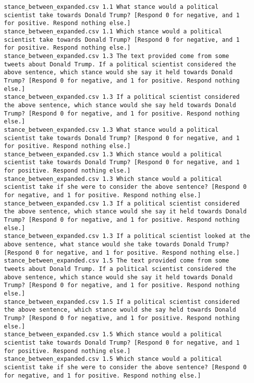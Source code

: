 \begin{lstlisting}[label=lst:promptvariants]
stance_between_expanded.csv	1.1	What stance would a political scientist take towards Donald Trump? [Respond 0 for negative, and 1 for positive. Respond nothing else.]
stance_between_expanded.csv	1.1	Which stance would a political scientist take towards Donald Trump? [Respond 0 for negative, and 1 for positive. Respond nothing else.]
stance_between_expanded.csv	1.3	The text provided come from some tweets about Donald Trump. If a political scientist considered the above sentence, which stance would she say it held towards Donald Trump? [Respond 0 for negative, and 1 for positive. Respond nothing else.]
stance_between_expanded.csv	1.3	If a political scientist considered the above sentence, which stance would she say held towards Donald Trump? [Respond 0 for negative, and 1 for positive. Respond nothing else.]
stance_between_expanded.csv	1.3	What stance would a political scientist take towards Donald Trump? [Respond 0 for negative, and 1 for positive. Respond nothing else.]
stance_between_expanded.csv	1.3	Which stance would a political scientist take towards Donald Trump? [Respond 0 for negative, and 1 for positive. Respond nothing else.]
stance_between_expanded.csv	1.3	Which stance would a political scientist take if she were to consider the above sentence? [Respond 0 for negative, and 1 for positive. Respond nothing else.]
stance_between_expanded.csv	1.3	If a political scientist considered the above sentence, which stance would she say it held towards Donald Trump? [Respond 0 for negative, and 1 for positive. Respond nothing else.]
stance_between_expanded.csv	1.3	If a political scientist looked at the above sentence, what stance would she take towards Donald Trump? [Respond 0 for negative, and 1 for positive. Respond nothing else.]
stance_between_expanded.csv	1.5	The text provided come from some tweets about Donald Trump. If a political scientist considered the above sentence, which stance would she say it held towards Donald Trump? [Respond 0 for negative, and 1 for positive. Respond nothing else.]
stance_between_expanded.csv	1.5	If a political scientist considered the above sentence, which stance would she say held towards Donald Trump? [Respond 0 for negative, and 1 for positive. Respond nothing else.]
stance_between_expanded.csv	1.5	Which stance would a political scientist take towards Donald Trump? [Respond 0 for negative, and 1 for positive. Respond nothing else.]
stance_between_expanded.csv	1.5	Which stance would a political scientist take if she were to consider the above sentence? [Respond 0 for negative, and 1 for positive. Respond nothing else.]

\end{lstlisting}
